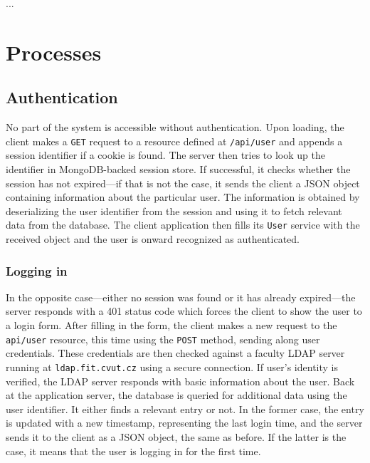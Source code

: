 \documentclass[thesis=M,english,hidelinks]{FITthesis}[2012/10/20]
\newcommand{\code}{\texttt}
\begin{document}
  ...


\chapter{Processes}

  \section{Authentication}

No part of the system is accessible without authentication. Upon loading, the client makes a \code{GET} request to a resource defined at \code{/api/user} and appends a session identifier if a cookie is found. The server then tries to look up the identifier in MongoDB-backed session store. If successful, it checks whether the session has not expired---if that is not the case, it sends the client a JSON object containing information about the particular user. The information is obtained by deserializing the user identifier from the session and using it to fetch relevant data from the database. The client application then fills its \code{User} service with the received object and the user is onward recognized as authenticated.

    \subsection{Logging in}

In the opposite case---either no session was found or it has already expired---the server responds with a 401 status code which forces the client to show the user to a login form. After filling in the form, the client makes a new request to the \code{api/user} resource, this time using the \code{POST} method, sending along user credentials. These credentials are then checked against a faculty LDAP server running at \code{ldap.fit.cvut.cz} using a secure connection. If user's identity is verified, the LDAP server responds with basic information about the user. Back at the application server, the database is queried for additional data using the user identifier. It either finds a relevant entry or not. In the former case, the entry is updated with a new timestamp, representing the last login time, and the server sends it to the client as a JSON object, the same as before. If the latter is the case, it means that the user is logging in for the first time.
\end{document}
